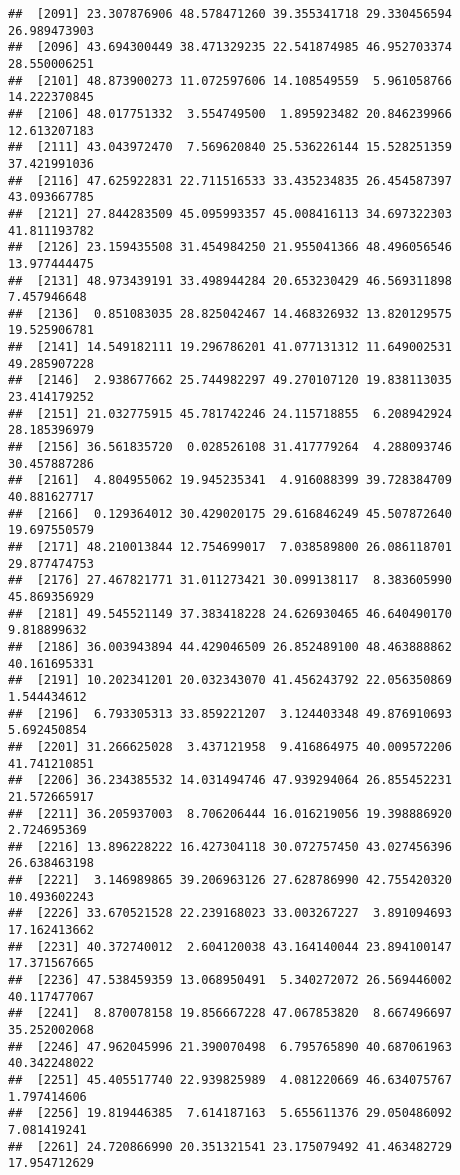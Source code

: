 \documentclass[
]{article}
\begin{document}
\begin{verbatim}
##  [2091] 23.307876906 48.578471260 39.355341718 29.330456594 26.989473903
##  [2096] 43.694300449 38.471329235 22.541874985 46.952703374 28.550006251
##  [2101] 48.873900273 11.072597606 14.108549559  5.961058766 14.222370845
##  [2106] 48.017751332  3.554749500  1.895923482 20.846239966 12.613207183
##  [2111] 43.043972470  7.569620840 25.536226144 15.528251359 37.421991036
##  [2116] 47.625922831 22.711516533 33.435234835 26.454587397 43.093667785
##  [2121] 27.844283509 45.095993357 45.008416113 34.697322303 41.811193782
##  [2126] 23.159435508 31.454984250 21.955041366 48.496056546 13.977444475
##  [2131] 48.973439191 33.498944284 20.653230429 46.569311898  7.457946648
##  [2136]  0.851083035 28.825042467 14.468326932 13.820129575 19.525906781
##  [2141] 14.549182111 19.296786201 41.077131312 11.649002531 49.285907228
##  [2146]  2.938677662 25.744982297 49.270107120 19.838113035 23.414179252
##  [2151] 21.032775915 45.781742246 24.115718855  6.208942924 28.185396979
##  [2156] 36.561835720  0.028526108 31.417779264  4.288093746 30.457887286
##  [2161]  4.804955062 19.945235341  4.916088399 39.728384709 40.881627717
##  [2166]  0.129364012 30.429020175 29.616846249 45.507872640 19.697550579
##  [2171] 48.210013844 12.754699017  7.038589800 26.086118701 29.877474753
##  [2176] 27.467821771 31.011273421 30.099138117  8.383605990 45.869356929
##  [2181] 49.545521149 37.383418228 24.626930465 46.640490170  9.818899632
##  [2186] 36.003943894 44.429046509 26.852489100 48.463888862 40.161695331
##  [2191] 10.202341201 20.032343070 41.456243792 22.056350869  1.544434612
##  [2196]  6.793305313 33.859221207  3.124403348 49.876910693  5.692450854
##  [2201] 31.266625028  3.437121958  9.416864975 40.009572206 41.741210851
##  [2206] 36.234385532 14.031494746 47.939294064 26.855452231 21.572665917
##  [2211] 36.205937003  8.706206444 16.016219056 19.398886920  2.724695369
##  [2216] 13.896228222 16.427304118 30.072757450 43.027456396 26.638463198
##  [2221]  3.146989865 39.206963126 27.628786990 42.755420320 10.493602243
##  [2226] 33.670521528 22.239168023 33.003267227  3.891094693 17.162413662
##  [2231] 40.372740012  2.604120038 43.164140044 23.894100147 17.371567665
##  [2236] 47.538459359 13.068950491  5.340272072 26.569446002 40.117477067
##  [2241]  8.870078158 19.856667228 47.067853820  8.667496697 35.252002068
##  [2246] 47.962045996 21.390070498  6.795765890 40.687061963 40.342248022
##  [2251] 45.405517740 22.939825989  4.081220669 46.634075767  1.797414606
##  [2256] 19.819446385  7.614187163  5.655611376 29.050486092  7.081419241
##  [2261] 24.720866990 20.351321541 23.175079492 41.463482729 17.954712629

\end{verbatim}
\end{document}
